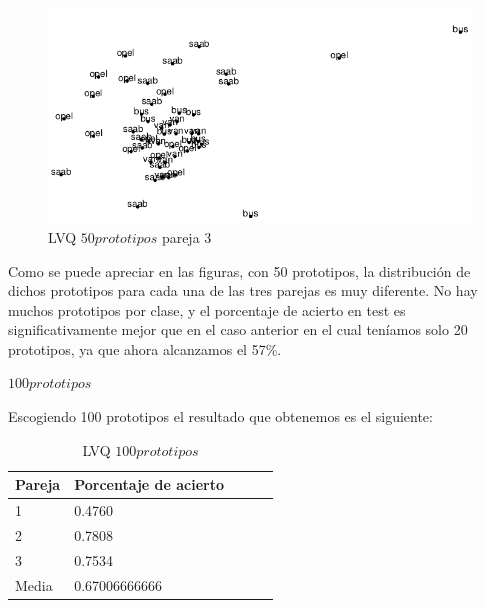 \documentclass[11pt,spanish,listoffigures,listoftables]{workluis}
\begin{document}
\begin{figure}[H]
\centering
\includegraphics[scale=0.5]{lvq50p3}
\caption{LVQ $50 prototipos$ pareja 3}
\end{figure} 

\par Como se puede apreciar en las figuras, con 50 prototipos, la distribución de dichos prototipos para cada una de las tres parejas es muy diferente. No hay muchos prototipos por clase, y el porcentaje de acierto en test es significativamente mejor que en el caso anterior en el cual teníamos solo 20 prototipos, ya que ahora alcanzamos el 57\%.


\par \textbf{$100 prototipos$}

\par Escogiendo 100 prototipos el resultado que obtenemos es el siguiente:

\begin{table}[H]
\centering
\caption{LVQ $100 prototipos$}
\label{tb:tb23}
\begin{tabular}{lllll}
\hline
\multicolumn{1}{|l|}{Pareja} & Porcentaje de acierto \\ \hline \hline
1                            & 0.4760			     \\
2                            & 0.7808			     \\
3                            & 0.7534			     \\
Media                        & 0.67006666666         \\ \hline
\end{tabular}
\end{table}
\end{document}
